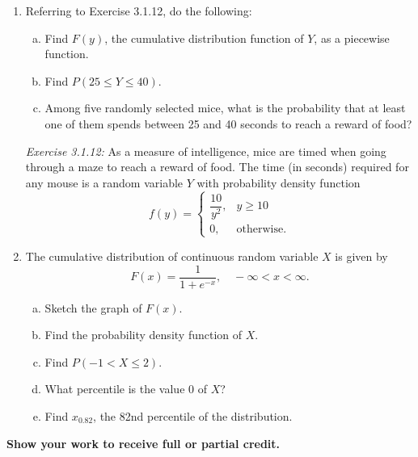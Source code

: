 \documentclass[12pt]{article}
\begin{document}
\begin{enumerate}
  \item Referring to Exercise 3.1.12, do the following:
    \begin{enumerate}[(a)]
      \item Find $F(y)$, the cumulative distribution function of $Y$, as a piecewise function.
      \item Find $P(25 \le Y \le 40)$.
      \item Among five randomly selected mice, what is the probability that at least one of them spends between 25 and 40 seconds to reach a reward of food?
    \end{enumerate}

    \textit{Exercise 3.1.12:} As a measure of intelligence, mice are timed when going through a maze to reach a reward of food. The time (in seconds) required for any mouse is a random variable $Y$ with probability density function
    \[
      f(y) = \begin{cases} \dfrac{10}{y^2}, & y \ge 10 \\[6pt] 0, & \text{otherwise.} \end{cases}
    \]

  \item The cumulative distribution of continuous random variable $X$ is given by
    \[
      F(x) = \frac{1}{1 + e^{-x}}, \quad -\infty < x < \infty.
    \]
    \begin{enumerate}[(a)]
      \item Sketch the graph of $F(x)$.
      \item Find the probability density function of $X$.
      \item Find $P(-1 < X \le 2)$.
      \item What percentile is the value $0$ of $X$?
      \item Find $x_{0.82}$, the 82nd percentile of the distribution.
    \end{enumerate}
\end{enumerate}

\begin{center}
  \textbf{\large Show your work to receive full or partial credit.}
\end{center}
\end{document}
